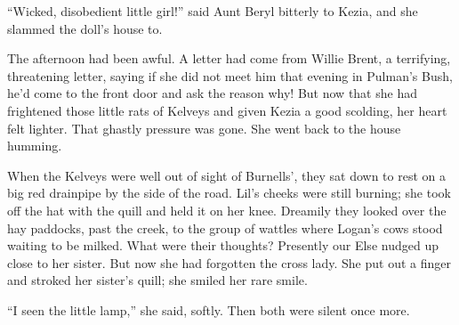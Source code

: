 \documentclass[10pt,a4paper]{article}
\begin{document}
“Wicked, disobedient little girl!” said Aunt Beryl bitterly to Kezia, and she slammed the doll’s house to.

The afternoon had been awful. A letter had come from Willie Brent, a terrifying, threatening letter, saying if she did not meet him that evening in Pulman’s Bush, he’d come to the front door and ask the reason why! But now that she had frightened those little rats of Kelveys and given Kezia a good scolding, her heart felt lighter. That ghastly pressure was gone. She went back to the house humming.

When the Kelveys were well out of sight of Burnells’, they sat down to rest on a big red drainpipe by the side of the road. Lil’s cheeks were still burning; she took off the hat with the quill and held it on her knee. Dreamily they looked over the hay paddocks, past the creek, to the group of wattles where Logan’s cows stood waiting to be milked. What were their thoughts? Presently our Else nudged up close to her sister. But now she had forgotten the cross lady. She put out a finger and stroked her sister’s quill; she smiled her rare smile.

“I seen the little lamp,” she said, softly. Then both were silent once more.
\end{document}
